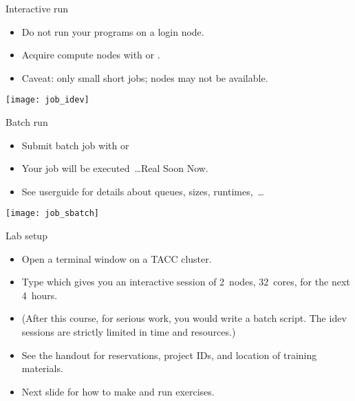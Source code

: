 \begin{numberedframe}{Interactive run}
  \begin{itemize}
  \item Do not run your programs on a login node.
  \item Acquire compute nodes with  or .
  \item Caveat: only small short jobs; nodes may not be available.
  \end{itemize}
  \texttt{[image: job\_idev]}
\end{numberedframe}

\begin{numberedframe}{Batch run}
  \begin{itemize}
  \item Submit batch job with  or 
  \item Your job will be executed~\ldots Real Soon Now.
  \item See userguide for details about queues, sizes, runtimes,~\ldots
  \end{itemize}
  \texttt{[image: job\_sbatch]}
\end{numberedframe}

\begin{tacc}
  \begin{numberedframe}{Lab setup}
    \begin{itemize}
    \item Open a terminal window on a TACC cluster.
    \item Type  which gives
      you an interactive session of 2~nodes, 32~cores, for the next
      4~hours.
    \item (After this course, for serious work, you would write a
      batch script. The idev sessions are strictly limited in time and
      resources.)
    \item See the handout for reservations, project IDs, and location of training materials.
    \item Next slide for how to make and run exercises.
    \end{itemize}
  \end{numberedframe}
\end{tacc}


